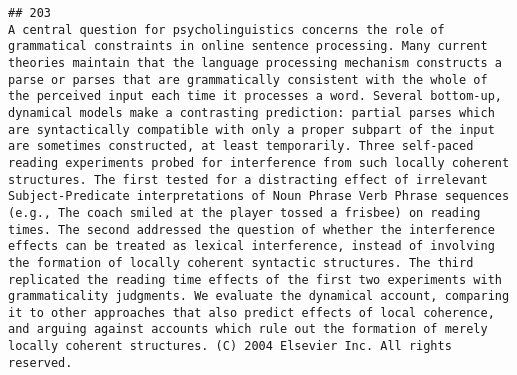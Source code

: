 \documentclass[
  english,
  man]{apa6}
\begin{document}
\begin{verbatim}
## 203                                                                                                                                                                                                                                                                                                                                                                                                                                                                                                                                                                                                                                                                                                                                                                                                                                                                                                                                                                                                                                                                                                                                                                                                                                            A central question for psycholinguistics concerns the role of grammatical constraints in online sentence processing. Many current theories maintain that the language processing mechanism constructs a parse or parses that are grammatically consistent with the whole of the perceived input each time it processes a word. Several bottom-up, dynamical models make a contrasting prediction: partial parses which are syntactically compatible with only a proper subpart of the input are sometimes constructed, at least temporarily. Three self-paced reading experiments probed for interference from such locally coherent structures. The first tested for a distracting effect of irrelevant Subject-Predicate interpretations of Noun Phrase Verb Phrase sequences (e.g., The coach smiled at the player tossed a frisbee) on reading times. The second addressed the question of whether the interference effects can be treated as lexical interference, instead of involving the formation of locally coherent syntactic structures. The third replicated the reading time effects of the first two experiments with grammaticality judgments. We evaluate the dynamical account, comparing it to other approaches that also predict effects of local coherence, and arguing against accounts which rule out the formation of merely locally coherent structures. (C) 2004 Elsevier Inc. All rights reserved.

\end{verbatim}
\end{document}
